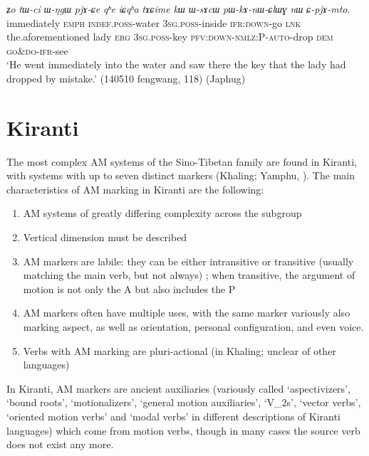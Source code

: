 \documentclass[oneside,a4paper,11pt]{article}
\newcommand{\ipa}[1]{{\phon\textit{#1}}}
\newcommand{\rouge}[1]{{\color{red}#1}}
\begin{document}
\begin{exe}
\ex  \label{ex:CpjAmto}
\gll  \ipa{nɯɕɯmɯma}	\ipa{ʑo}	\ipa{tɯ-ci}	\ipa{ɯ-ŋgɯ}	\ipa{pjɤ-ɕe}	\ipa{qʰe}	\ipa{iɕqʰa}	\ipa{tɤɕime}	\ipa{kɯ}	\ipa{ɯ-sɤcɯ}	\ipa{pɯ-kɤ-nɯ-ɕlɯɣ}	\ipa{nɯ}	\ipa{\rouge{ɕ}-pjɤ-mto}. \\
immediately \textsc{emph} \textsc{indef}.\textsc{poss}-water \textsc{3sg}.\textsc{poss}-inside \textsc{ifr}:\textsc{down}-go \textsc{lnk} the.aforementioned lady \textsc{erg} \textsc{3sg}.\textsc{poss}-key \textsc{pfv}:\textsc{down}-\textsc{nmlz}:P-\textsc{auto}-drop \textsc{dem} \rouge{\textsc{go\&do}}-\textsc{ifr}-see \\
\glt `He went immediately into the water and saw there the key that the lady had dropped by mistake.' (140510 fengwang, 118) (Japhug)
\end{exe}

\section{Kiranti}  
The most complex AM systems of the Sino-Tibetan family are found in Kiranti, with systems with up to seven distinct markers (Khaling; Yamphu, \citealt[137-194]{rutgers98yamphu}).
The main characteristics of AM marking in Kiranti are the following:

\begin{enumerate}
\item AM systems of greatly differing complexity across the subgroup
\item Vertical dimension must be described
\item AM markers are labile: they can be either intransitive or transitive (usually matching the main verb, but not always) ; when transitive, the argument of motion is not only the A but also includes the P
\item AM markers often have multiple uses, with the same marker variously also marking aspect, as well as orientation, personal configuration, and even voice.
\item Verbs with AM marking are pluri-actional (in Khaling; unclear of other languages)
\end{enumerate}


In Kiranti, AM markers are ancient auxiliaries (variously called `aspectivizers', `bound roots', `motionalizers',   `general motion auxiliaries', `V_2s', `vector verbs', `oriented motion verbs' and `modal verbs' in different descriptions of Kiranti languages) which come from motion verbs, though in many cases the source verb does not exist any more. 
 
\end{document}
